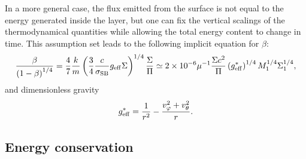 \documentclass[usenatbib,onecolumn]{mnras}
\begin{document}
In a more general case, the flux emitted from the surface is not equal to the
energy generated inside the layer, but one can fix the vertical scalings of
the thermodynamical quantities while allowing the total energy content to
change in time. This assumption set leads to the following implicit equation
for $\beta$:
\begin{equation}\label{E:vert:beta:new}
\frac{\beta}{\left(1-\beta\right)^{1/4}} = \frac{4}{7} \frac{k}{m}
\left(\frac{3}{4}\frac{c}{\sigma_{\rm SB}} g_{\rm eff} \Sigma \right)^{1/4}
\frac{\Sigma}{\Pi} \simeq 2\times 10^{-6} \mu^{-1} \frac{\Sigma c^2}{\Pi}
\left(g_{\rm eff}^*\right)^{1/4} M_1^{1/4} \Sigma_1^{1/4},
\end{equation}
and dimensionless gravity
\begin{equation}\label{E:vert:gravity}
g_{\rm eff}^* = \frac{1}{r^2} - \frac{v_\varphi^2 + v_\theta^2}{r}.
\end{equation}

\subsection{Energy conservation}
\end{document}
